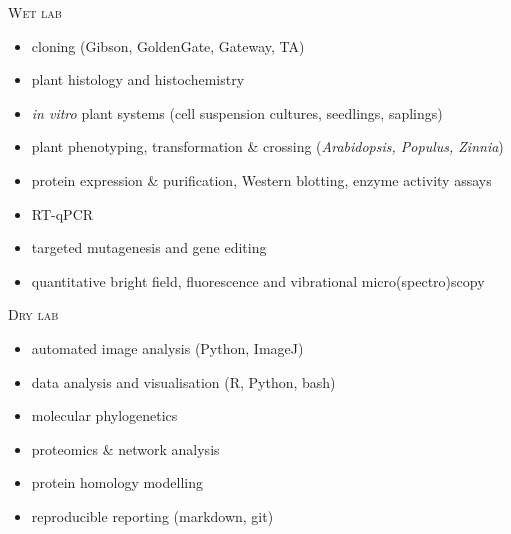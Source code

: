\documentclass[11pt]{article}
\begin{document}
\textsc{\large{Wet lab}} 
\vspace{-0.175cm}
\begin{addmargin}[24pt]{0pt}
	\begin{multicols}{2}
		\raggedright
		\begin{itemize}[itemindent=-9pt,leftmargin=24pt]
			\itemsep-0.1cm
			\item cloning (Gibson, GoldenGate, Gateway, TA)
			\item plant histology and histochemistry
			\item \textit{in vitro} plant systems (cell suspension cultures, seedlings, saplings)
			\item plant phenotyping, transformation \& crossing (\textit{Arabidopsis, Populus, Zinnia})
			\item protein expression \& purification, Western blotting, enzyme activity assays
			\item RT-qPCR
			\item targeted mutagenesis and gene editing
			\item quantitative bright field, fluorescence and vibrational micro(spectro)scopy
		\end{itemize}
	\end{multicols}
\end{addmargin}
\vspace{0.2cm}

\textsc{\large{Dry lab}} 
\vspace{-0.175cm}
\begin{addmargin}[24pt]{0pt}
	\begin{multicols}{2}
		\raggedright
		\begin{itemize}[itemindent=-9pt,leftmargin=24pt]
			\itemsep-0.1cm
			\item automated image analysis (Python, ImageJ)
			\item data analysis and visualisation (R, Python, bash)
			\item molecular phylogenetics
			\item proteomics \& network analysis
			\item protein homology modelling
			\item reproducible reporting (markdown, git)
		\end{itemize}
	\end{multicols}
\end{addmargin}
\vspace{0.5cm}
\end{document}
